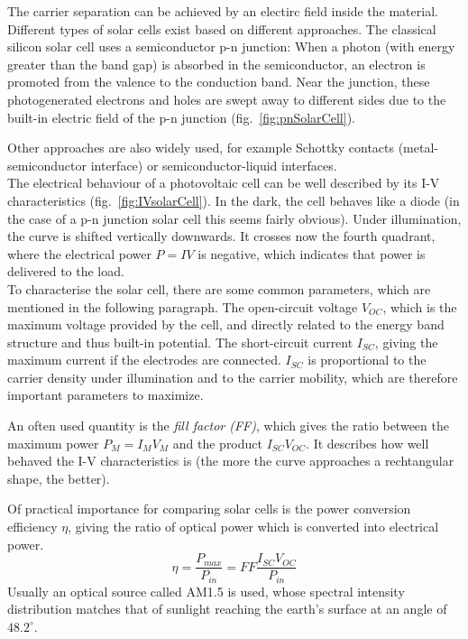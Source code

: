 The carrier separation can be achieved by an electirc field inside the material. Different types of solar cells exist based on different approaches. The classical silicon solar cell uses a semiconductor p-n junction: When a photon (with energy greater than the band gap) is absorbed in the semiconductor, an electron is promoted from the valence to the conduction band. Near the junction, these photogenerated electrons and holes are swept away to different sides due to the built-in electric field of the p-n junction (fig.~\ref{fig:pnSolarCell}). 

Other approaches are also widely used, for example Schottky contacts (metal-semiconductor interface) or semiconductor-liquid interfaces.\\

The electrical behaviour of a photovoltaic cell can be well described by its I-V characteristics (fig.~\ref{fig:IVsolarCell}). In the dark, the cell behaves like a diode (in the case of a p-n junction solar cell this seems fairly obvious). Under illumination, the curve is shifted vertically downwards. It crosses now the fourth quadrant, where the electrical power $P=IV$ is negative, which indicates that power is delivered to the load.\\

To characterise the solar cell, there are some common parameters, which are mentioned in the following paragraph. The open-circuit voltage $V_{OC}$, which is the maximum voltage provided by the cell, and directly related to the energy band structure and thus built-in potential. The short-circuit current $I_{SC}$, giving the maximum current if the electrodes are connected. $I_{SC}$ is proportional to the carrier density under illumination and to the carrier mobility, which are therefore important parameters to maximize.

An often used quantity is the \textit{fill factor (FF)}, which gives the ratio between the maximum power $P_M=I_M V_M$ and the product $I_{SC} V_{OC}$. It describes how well behaved the I-V characteristics is (the more the curve approaches a rechtangular shape, the better).

Of practical importance for comparing solar cells is the power conversion efficiency $\eta$, giving the ratio of optical power which is converted into electrical power. 
\[\eta = \frac{P_{max}}{P_{in}} = FF\frac{I_{SC}V_{OC}}{P_{in}}\]
Usually an optical source called AM1.5 is used, whose spectral intensity distribution matches that of sunlight reaching the earth's surface at an angle of $48.2^{\circ}$. \cite[pp.426-433]{ChemRev}


